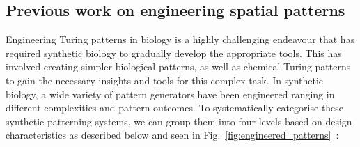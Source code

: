 \subsection{Previous work on engineering spatial patterns}

Engineering Turing patterns in biology is a highly challenging endeavour that has required synthetic biology to gradually develop the appropriate tools.
This has involved creating simpler biological patterns, as well as chemical Turing patterns to gain the necessary insights and tools for this complex task.
In synthetic biology, a wide variety of pattern generators have been engineered ranging in different complexities and pattern outcomes.
To systematically categorise these synthetic patterning systems, we can group them into four levels based on design characteristics as described below and seen in Fig.~\ref{fig:engineered_patterns}~\parencite{oliverhuidobro}:


